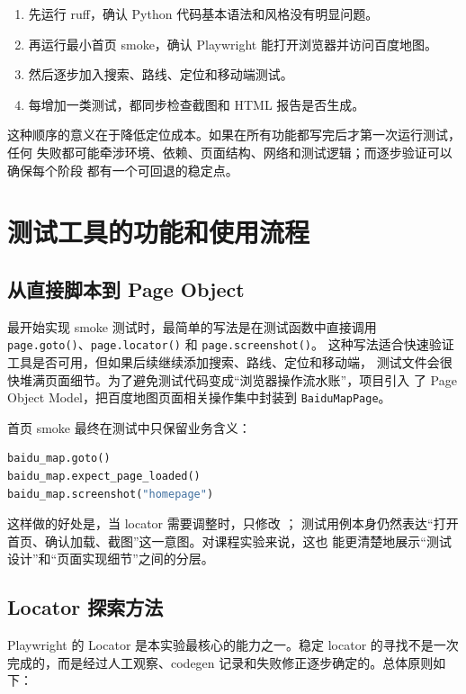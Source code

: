 \documentclass[UTF8,a4paper,12pt]{ctexart}
\begin{document}
\begin{enumerate}
  \item 先运行 ruff，确认 Python 代码基本语法和风格没有明显问题。
  \item 再运行最小首页 smoke，确认 Playwright 能打开浏览器并访问百度地图。
  \item 然后逐步加入搜索、路线、定位和移动端测试。
  \item 每增加一类测试，都同步检查截图和 HTML 报告是否生成。
\end{enumerate}

这种顺序的意义在于降低定位成本。如果在所有功能都写完后才第一次运行测试，任何
失败都可能牵涉环境、依赖、页面结构、网络和测试逻辑；而逐步验证可以确保每个阶段
都有一个可回退的稳定点。

\section{测试工具的功能和使用流程}

\subsection{从直接脚本到 Page Object}

最开始实现 smoke 测试时，最简单的写法是在测试函数中直接调用
\texttt{page.goto()}、\texttt{page.locator()} 和 \texttt{page.screenshot()}。
这种写法适合快速验证工具是否可用，但如果后续继续添加搜索、路线、定位和移动端，
测试文件会很快堆满页面细节。为了避免测试代码变成“浏览器操作流水账”，项目引入
了 Page Object Model，把百度地图页面相关操作集中封装到 \texttt{BaiduMapPage}。

首页 smoke 最终在测试中只保留业务含义：

\begin{lstlisting}[language=Python]
baidu_map.goto()
baidu_map.expect_page_loaded()
baidu_map.screenshot("homepage")
\end{lstlisting}

这样做的好处是，当 locator 需要调整时，只修改 ；
测试用例本身仍然表达“打开首页、确认加载、截图”这一意图。对课程实验来说，这也
能更清楚地展示“测试设计”和“页面实现细节”之间的分层。

\subsection{Locator 探索方法}

Playwright 的 Locator 是本实验最核心的能力之一。稳定 locator 的寻找不是一次
完成的，而是经过人工观察、codegen 记录和失败修正逐步确定的。总体原则如下：
\end{document}

